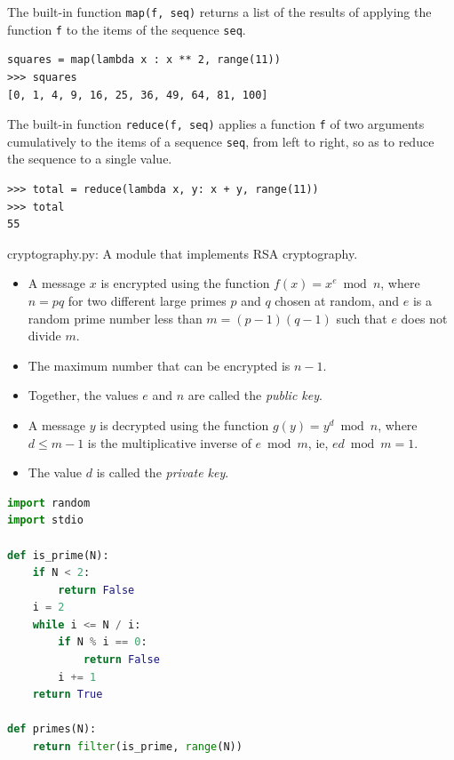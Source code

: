 \documentclass[8pt,a4paper,compress,handout]{beamer}
\begin{document}
\begin{frame}[fragile]
The built-in function \lstinline{map(f, seq)} returns a list of the results of applying the function \lstinline{f} to the items of the sequence \lstinline{seq}.
\begin{lstlisting}[language={}]
squares = map(lambda x : x ** 2, range(11))
>>> squares
[0, 1, 4, 9, 16, 25, 36, 49, 64, 81, 100]
\end{lstlisting}

\bigskip

The built-in function \lstinline{reduce(f, seq)} applies a function \lstinline{f} of two arguments cumulatively to the items of a sequence \lstinline{seq}, from left to right, so as to reduce the sequence to a single value.
\begin{lstlisting}[language={}]
>>> total = reduce(lambda x, y: x + y, range(11))
>>> total
55
\end{lstlisting}
\end{frame}

\begin{frame}[fragile]
\begin{framed}
\tiny cryptography.py: A module that implements RSA cryptography.
\begin{itemize}

\item A message $x$ is encrypted using the function $f(x) = x^e \bmod n$, where $n=pq$ for two different large primes $p$ and $q$ chosen at random, and $e$ is a random prime number less than $m=(p-1)(q-1)$ such that $e$ does not divide $m$. 

\item The maximum number that can be encrypted is $n-1$.

\item Together, the values $e$ and $n$ are called the \emph{public key}.

\item A message $y$ is decrypted using the function $g(y) = y^d \bmod n$, where $d \leq m-1$ is the multiplicative inverse of $e \bmod m$, ie, $ed \bmod m = 1$.

\item The value $d$ is called the \emph{private key}.
\end{itemize}
\end{framed}
\begin{lstlisting}[language=Python]
import random
import stdio

def is_prime(N):
    if N < 2: 
        return False
    i = 2
    while i <= N / i:
        if N % i == 0:
            return False
        i += 1
    return True

def primes(N):
    return filter(is_prime, range(N))
\end{lstlisting}
\end{frame}
\end{document}
